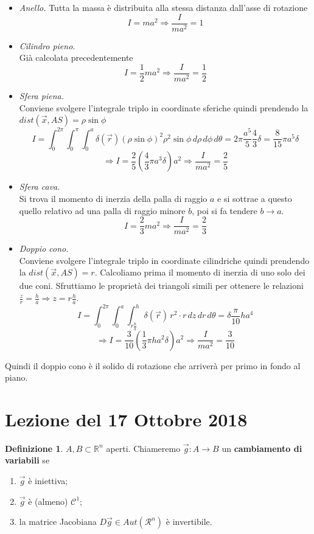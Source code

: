 \documentclass[10pt]{article}
\theoremstyle{plain}
\theoremstyle{definition}
\newtheorem{defn}{Definizione}
\begin{document}
\begin{itemize}
    \item \textit{Anello.}\newline
Tutta la massa è distribuita alla stessa distanza dall'asse di rotazione
$$I=ma^2 \Rightarrow \frac{I}{ma^2}=1$$
    \item \textit{Cilindro pieno.}\\
Già calcolata precedentemente
$$I=\frac{1}{2}ma^2 \Rightarrow \frac{I}{ma^2}=\frac{1}{2}$$
\item \textit{Sfera piena.}\\
Conviene svolgere l'integrale triplo in coordinate sferiche quindi prendendo la $dist(\vec{x},AS) = \rho \sin \phi$
$$I = \int_0^{2\pi}\int_0^{\pi}\int_0^a \delta(\vec{r})(\rho\sin\phi)^2\rho^2\sin\phi \,d\rho \,d\phi \,d\theta = 2 \pi \frac{a^5}{5} \frac{4}{3} \delta = \frac{8}{15} \pi a^5 \delta $$
$$\Rightarrow I=\frac{2}{5}\left( \frac{4}{3} \pi  a^3 \delta\right)a^2 \Rightarrow \frac{I}{ma^2}=\frac{2}{5}$$
\item \textit{Sfera cava.}\\
Si trova il momento di inerzia della palla di raggio $a$ e si sottrae a questo quello relativo ad una palla di raggio minore $b$, poi si fa tendere $b \to a$. 
$$I=\frac{2}{3}ma^2 \Rightarrow \frac{I}{ma^2}=\frac{2}{3}$$
\item \textit{Doppio cono.}\\
Conviene svolgere l'integrale triplo in coordinate cilindriche quindi prendendo la $dist(\vec{x},AS) = r$. Calcoliamo prima il momento di inerzia di uno solo dei due coni. Sfruttiamo le proprietà dei triangoli simili per ottenere le relazioni $\frac{z}{r} = \frac{h}{a} \Rightarrow z=r\frac{h}{a}$.
$$I = \int_0^{2\pi}\int_0^{a}\int_{r\frac{h}{a}}^h \delta(\vec{r})\,r^2 \cdot r \,dz \,dr \,d\theta = \delta \frac{\pi}{10} h a^4$$
$$\Rightarrow I=\frac{3}{10}\left( \frac{1}{3} \pi h a^2 \delta\right)a^2 \Rightarrow \frac{I}{ma^2}=\frac{3}{10}$$
\end{itemize}
Quindi il doppio cono è il solido di rotazione che arriverà per primo in fondo al piano.

\section{Lezione del 17 Ottobre 2018}
\begin{defn}
$A, B \subset \mathbb{R}^n$ aperti. Chiameremo $\vec{g}:A\to B$ un \textbf{cambiamento di variabili} se
\begin{enumerate}
    \item $\vec{g}$ è iniettiva;
    \item $\vec{g}$ è (almeno) $\mathcal{C}^1$;
    \item la matrice Jacobiana $D\vec{g} \in Aut(\mathcal{R}^n)$ è invertibile.
\end{enumerate}
\end{defn}
\end{document}

